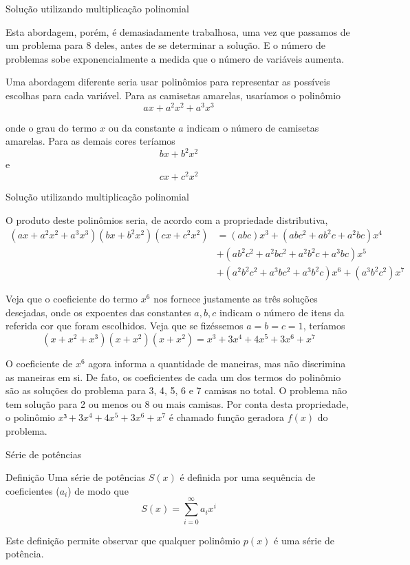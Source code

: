 \begin{frame}[fragile]{Solução utilizando multiplicação polinomial}

Esta abordagem, porém, é demasiadamente trabalhosa, uma vez que passamos de um problema para 8
deles, antes de se determinar a solução. E o número de problemas sobe exponencialmente a 
medida que o número de variáveis aumenta.

Uma abordagem diferente seria usar polinômios para representar as possíveis escolhas para
cada variável. Para as camisetas amarelas, usaríamos o polinômio
\[
        ax + a^2x^2 + a^3x^3
\]

onde o grau do termo $x$ ou da constante $a$ indicam o número de camisetas amarelas. Para as
demais cores teríamos
\[
        bx + b^2x^2
\]
e
\[
        cx + c^2x^2
\]
\end{frame}

\begin{frame}[fragile]{Solução utilizando multiplicação polinomial}

O produto deste polinômios seria, de acordo com a propriedade distributiva,
\[
\begin{split}
        (ax + a^2x^2 + a^3x^3)(bx + b^2x^2)(cx + c^2x^2) & =(abc)x^3 + (abc^2 + ab^2c + a^2bc)x^4 \\
    &+ (ab^2c^2 + a^2bc^2 + a^2b^2c + a^3bc)x^5\\
    &+ (a^2b^2c^2 + a^3bc^2+ a^3b^2c)x^6 + (a^3b^2c^2)x^7
\end{split}
\]

Veja que o coeficiente do termo $x^6$ nos fornece justamente as três soluções desejadas, onde
os expoentes das constantes $a, b, c$ indicam o número de itens da referida cor que foram
escolhidos. Veja que se fizéssemos $a = b = c = 1$, teríamos
\[ 
        (x + x^2 + x^3)(x + x^2)(x + x^2) = x^3 + 3x^4 + 4x^5 + 3x^6 + x^7
\]

O coeficiente de $x^6$ agora informa a quantidade de maneiras, mas não discrimina as maneiras em
si. De fato, os coeficientes de cada um dos termos do polinômio são as soluções do problema para
3, 4, 5, 6 e 7 camisas no total. O problema não tem solução para 2 ou menos ou 8 ou mais camisas.
Por conta desta propriedade, o polinômio $x³ + 3x^4 + 4x^5 + 3x^6 + x^7$ é chamado função 
geradora $f(x)$ do problema.

\end{frame}

\begin{frame}[fragile]{Série de potências}

    \begin{block}{Definição}
        Uma série de potências $S(x)$ é definida por uma sequência de coeficientes ($a_i$) de modo que
        \[
        S(x) = \sum_{i=0}^\infty a_ix^i
        \]

    \end{block}

    \vspace{0.2in}

Este definição permite observar que qualquer polinômio $p(x)$ é uma série de potência.

\end{frame}


